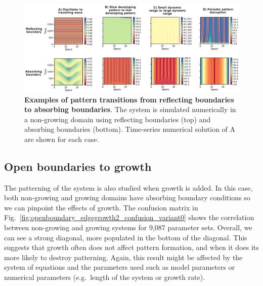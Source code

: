 \begin{figure}[H] %
    \centering
    \begin{adjustbox}{center}
        \includegraphics[width=1\textwidth]{chapters/Chapter 1/interesting_cases_openboundary} %
    \end{adjustbox}
    \caption{\textbf{Examples of pattern transitions from reflecting boundaries to absorbing boundaries}. The system is simulated numerically in a non-growing domain using reflecting boundaries (top) and absorbing boundaries (bottom). Time-series numerical solution of A are shown for each case.}
    \label{fig:interesting_cases_openboundary}
\end{figure}

\subsection{Open boundaries to growth}
The patterning of the system is also studied when growth is added.
In this case, both non-growing and growing domains have absorbing boundary conditions so we can pinpoint the effects of growth.
The confusion matrix in Fig.~\ref{fig:openboundary_edgegrowth2_confusion_variant0} shows the correlation between non-growing and growing systems for 9,087 parameter sets.
Overall, we can see a strong diagonal, more populated in the bottom of the diagonal.
This suggests that growth often does not affect pattern formation, and when it does its more likely to destroy patterning.
Again, this result might be affected by the system of equations and the parameters used such as model parameters or numerical parameters (e.g.~length of the system or growth rate). %

